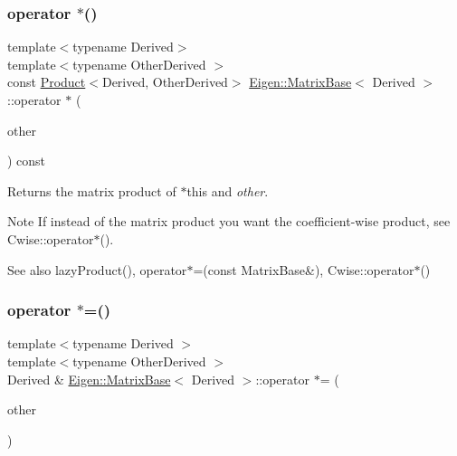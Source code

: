 \subsubsection{\texorpdfstring{operator $\ast$()}{operator *()}\hspace{0.1cm}{\footnotesize\ttfamily [2/2]}}
{\footnotesize\ttfamily template$<$typename Derived$>$ \\
template$<$typename Other\+Derived $>$ \\
const \mbox{\hyperlink{class_eigen_1_1_product}{Product}}$<$Derived, Other\+Derived$>$ \mbox{\hyperlink{class_eigen_1_1_matrix_base}{Eigen\+::\+Matrix\+Base}}$<$ Derived $>$\+::operator $\ast$ (\begin{DoxyParamCaption}\item[{const \mbox{\hyperlink{class_eigen_1_1_matrix_base}{Matrix\+Base}}$<$ Other\+Derived $>$ \&}]{other }\end{DoxyParamCaption}) const\hspace{0.3cm}{\ttfamily [inline]}}

\begin{DoxyReturn}{Returns}
the matrix product of {\ttfamily $\ast$this} and {\itshape other}.
\end{DoxyReturn}
\begin{DoxyNote}{Note}
If instead of the matrix product you want the coefficient-\/wise product, see Cwise\+::operator$\ast$().
\end{DoxyNote}
\begin{DoxySeeAlso}{See also}
lazy\+Product(), operator$\ast$=(const Matrix\+Base\&), Cwise\+::operator$\ast$() 
\end{DoxySeeAlso}
\mbox{\label{class_eigen_1_1_matrix_base_aaa2fc32463392a7488686e6f3007f278}} 
\subsubsection{\texorpdfstring{operator $\ast$=()}{operator *=()}}
{\footnotesize\ttfamily template$<$typename Derived $>$ \\
template$<$typename Other\+Derived $>$ \\
Derived \& \mbox{\hyperlink{class_eigen_1_1_matrix_base}{Eigen\+::\+Matrix\+Base}}$<$ Derived $>$\+::operator $\ast$= (\begin{DoxyParamCaption}\item[{const \mbox{\hyperlink{struct_eigen_1_1_eigen_base}{Eigen\+Base}}$<$ Other\+Derived $>$ \&}]{other }\end{DoxyParamCaption})\hspace{0.3cm}{\ttfamily [inline]}}

